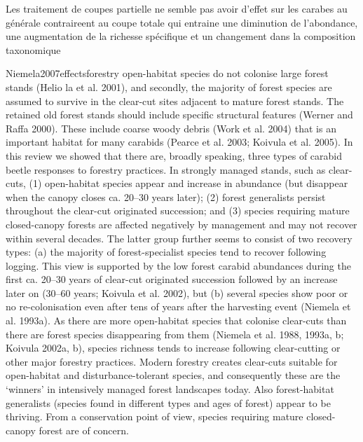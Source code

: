 Les traitement de coupes partielle ne semble pas avoir d'effet sur les carabes au générale contraireent au coupe totale qui entraine une diminution de l'abondance, une augmentation de la richesse spécifique et un changement dans la composition taxonomique \citep{Niemela2007effectsforestry,Kudrin2023metaanalysiseffects}

Niemela2007effectsforestry
open-habitat species do not colonise large forest stands (Helio  la  et al. 2001), and secondly, the majority of forest species are assumed to survive in the clear-cut sites adjacent to mature forest stands.
The retained old forest stands should include specific structural features (Werner and Raffa 2000). These include coarse woody debris (Work et al. 2004) that is an important habitat for many carabids (Pearce et al. 2003; Koivula et al. 2005).
In this review we showed that there are, broadly speaking, three types of carabid beetle responses to forestry practices. 
In strongly managed stands, such as clear-cuts, (1) open-habitat species appear and increase in abundance 
(but disappear when the canopy closes ca. 20–30 years later); (2) forest generalists persist throughout the clear-cut originated succession; 
and (3) species requiring mature closed-canopy forests are affected negatively by management and may not recover within several decades. 
The latter group further seems to consist of two recovery types: (a) the majority of forest-specialist species tend to recover following logging. 
This view is supported by the low forest carabid abundances during the first ca. 20–30 years of clear-cut originated succession followed by an increase later on (30–60 years; Koivula et al. 2002), but (b) several species show poor or no re-colonisation even after tens of years after the harvesting event (Niemela  et al. 1993a).
As there are more open-habitat species that colonise clear-cuts than there are forest species disappearing from them (Niemela  et al. 1988, 1993a, b; Koivula 2002a, b), species richness tends to increase following clear-cutting or other major forestry practices. Modern forestry creates clear-cuts suitable for open-habitat and disturbance-tolerant species, and consequently these are the ‘winners’ in intensively managed forest landscapes today. Also forest-habitat generalists (species found in different types and ages of forest) appear to be thriving. 
From a conservation point of view, species requiring mature closed-canopy forest are of concern.


